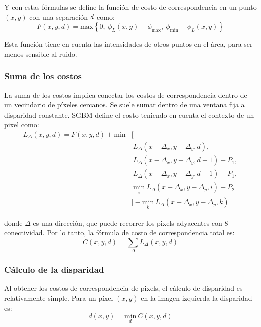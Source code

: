 \documentclass[11pt,a4paper,titlepage]{article}
\newcommand{\Scalar}[1]{\ensuremath{\mathnormal{#1}}}
\begin{document}
Y con estas fórmulas se define la función de costo de correspondencia en un punto $(x, y)$ con una separación \Scalar{d} como:
\[
	F(x, y, d) = \mathrm{max} \left\{ 0,\ \phi_L(x, y) - \phi_\mathrm{max},\ \phi_\mathrm{min} - \phi_L(x, y) \right\}
\]

Esta función tiene en cuenta las intensidades de otros puntos en el área, para ser menos sensible al ruido.

\subsubsection{Suma de los costos}

La suma de los costos implica conectar los costos de correspondencia dentro de un vecindario de píxeles cercanos. Se suele sumar dentro de una ventana fija a disparidad constante. SGBM define el costo teniendo en cuenta el contexto de un pixel como:
\begin{align*}
	L_\Delta(x, y, d) = F(x, y, d) + \mathrm{min} & [ \\
	                                                              &\ L_\Delta(x - \Delta_x, y - \Delta_y, d), \\
	                                                              &\ L_\Delta(x - \Delta_x, y - \Delta_y, d - 1) + P_1,\\
	                                                              &\ L_\Delta(x - \Delta_x, y - \Delta_y, d + 1) + P_1,\\
	                                                              &\ \underset{i}{\mathrm{min}}\ L_\Delta(x - \Delta_x, y - \Delta_y, i) + P_2\\
	                                                              & ] - \underset{k}{\mathrm{min}}\ L_\Delta(x - \Delta_x, y - \Delta_y, k)
\end{align*}

donde $\Delta$ es una dirección, que puede recorrer los pixels adyacentes con 8-conectividad. Por lo tanto, la fórmula de costo de correspondencia total es:
\[
	C(x, y, d) = \sum_\Delta L_\Delta(x, y, d)
\]

\subsubsection{Cálculo de la disparidad}

Al obtener los costos de correspondencia de pixels, el cálculo de disparidad es relativamente simple. Para un píxel $(x, y)$ en la imagen izquierda la disparidad es:
\[
	d(x, y) = \underset{d}{\mathrm{min}}\ C\left( x, y, d \right)
\]
\end{document}
